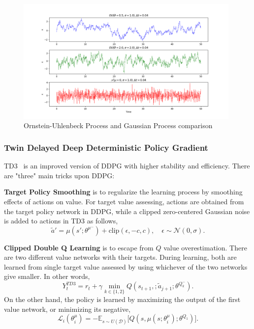 \begin{figure}
	\centering
	\includegraphics[width=0.98\textwidth]{figures/others/random_processes.png}
	\caption{Ornstein-Uhlenbeck Process and Gaussian Process comparison}
	\label{fig:ou_vs_gaussian}
\end{figure}

\subsubsection{Twin Delayed Deep Deterministic Policy Gradient}
TD3~\cite{fujimoto_addressing_2018} is an improved version of DDPG with higher stability and efficiency. 
There are "three" main tricks upon DDPG: 

\textbf{Target Policy Smoothing} is to regularize the learning process by smoothing effects of actions on value. For target value assessing, actions are obtained from the target policy network in DDPG, while a clipped zero-centered Gaussian noise is added to actions in TD3 as follows,
\begin{equation}
\label{eqn:td3_target_action}
\widetilde{a}' = \mu(s';\theta^{\mu^-}) + \text{clip}(\epsilon, -c, c), \quad \epsilon \sim \mathcal{N}(0, \sigma).
\end{equation}

\textbf{Clipped Double Q Learning} is to escape from $Q$ value overestimation. 
There are two different value networks with their targets. 
During learning, both are learned from single target value assessed by using whichever of the two networks give smaller. In other words, 
\begin{equation}
\label{eqn:td3_target}
Y_t^{TD3} = r_t + \gamma \min_{k\in\{1,2\}} Q(s_{t+1}, ;\widetilde{a}_{j+1};\theta^{Q_k^-}).
\end{equation}
On the other hand, the policy is learned by maximizing the output of the first value network, or minimizing its negative,
\begin{equation}
\label{eqn:td3_policy_loss}
\mathcal{L}_i(\theta^\mu_i) = -\mathbb{E}_{s \sim U(\mathcal{D})} \Big[ Q(s, \mu(s;\theta^\mu_i);\theta^{Q_1}) \Big].
\end{equation} 

